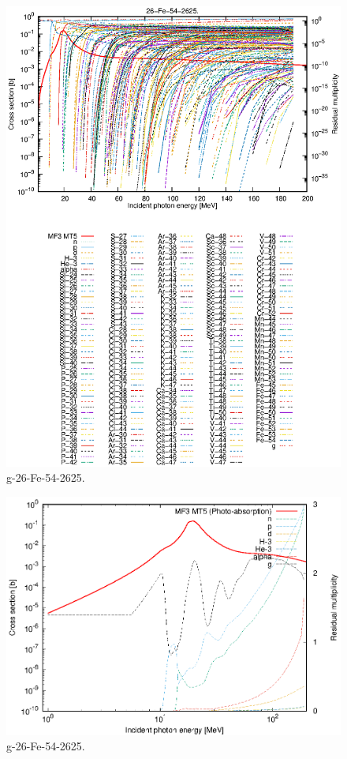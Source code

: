 \begin{figure}
 \includegraphics[width=\linewidth]{eps/g_26-Fe-54_2625.eps}
  \caption{g-26-Fe-54-2625.}
\end{figure}
\newpage \clearpage

\begin{figure}
 \includegraphics[width=\linewidth]{eps-log/g_26-Fe-54_2625.eps}
 \caption{g-26-Fe-54-2625.}
\end{figure}
\newpage \clearpage

